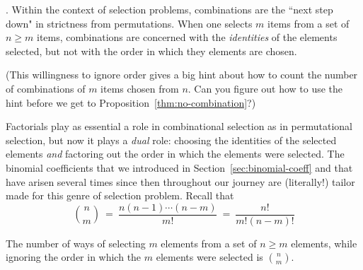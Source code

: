 
\medskip

.
Within the context of selection problems, combinations are the ``next step down" in
strictness from permutations.  When one selects $m$ items from a set of $n \geq m$ items,
combinations are concerned with the {\em identities} of the elements selected, but not with 
the order in which they elements are chosen.

\noindent (This willingness to ignore order gives a big hint about how to count the number of
combinations of $m$ items chosen from $n$.  Can you figure out how to use the hint before
we get to Proposition~\ref{thm:no-combination}?)

\medskip

Factorials play as essential a role in combinational selection as in permutational selection, but
now it plays a {\em dual} role: choosing the identities of the selected elements {\em and} factoring out
the order in which the elements were selected.  The binomial coefficients that we introduced
in Section~\ref{sec:binomial-coeff} and that have arisen several times since then
throughout our journey are
(literally!) tailor made for this genre of selection problem.  Recall that
\[ {n \choose m} \ = \ \frac{n(n-1)\cdots(n-m)}{m!} \ = \  \frac{n!}{m!(n-m)!} 
\]

\begin{prop}
\label{thm:no-combination}
The number of ways of selecting $m$ elements from a set of $n \geq m$ elements, while 
ignoring the order in which the $m$ elements were selected is $\displaystyle {n \choose m}$.
\end{prop}

